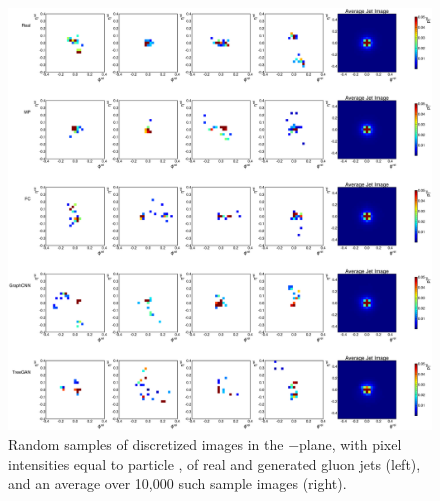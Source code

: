 \begin{figure}[htpb]
    \centering
    \centerline{\includegraphics[width=\textwidth]{figures/04-ML4Sim/mpgan/results/jet_images_g.pdf}}
    \caption{Random samples of discretized images in the \etarel$-$\phirel plane, with pixel intensities equal to particle \ptrel, of real and generated gluon jets (left), and an average over 10,000 such sample images (right).}
    \label{fig:04_mpgan_jetims_g}
\end{figure}

